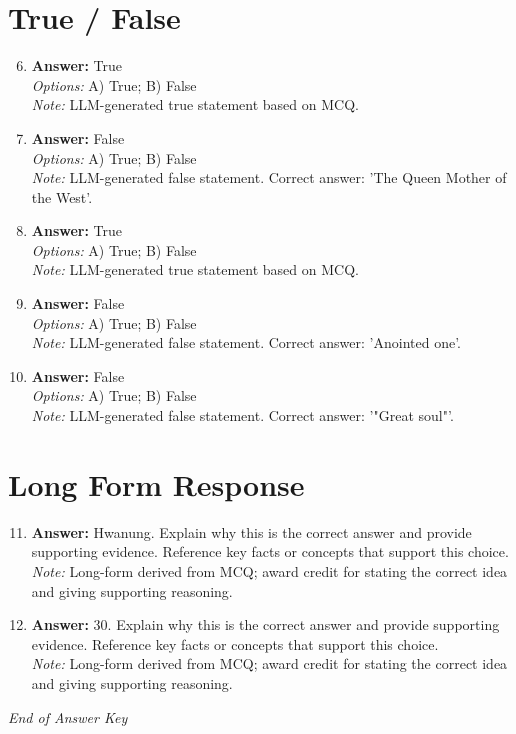 \documentclass[12pt]{article}
\begin{document}
\section*{True / False}
\begin{enumerate}[label=\arabic*.]
\setcounter{enumi}{5}
\item \textbf{Answer:} True
\\ \textit{Options:} A) True; B) False
\\ \textit{Note:} LLM-generated true statement based on MCQ.
\item \textbf{Answer:} False
\\ \textit{Options:} A) True; B) False
\\ \textit{Note:} LLM-generated false statement. Correct answer: 'The Queen Mother of the West'.
\item \textbf{Answer:} True
\\ \textit{Options:} A) True; B) False
\\ \textit{Note:} LLM-generated true statement based on MCQ.
\item \textbf{Answer:} False
\\ \textit{Options:} A) True; B) False
\\ \textit{Note:} LLM-generated false statement. Correct answer: 'Anointed one'.
\item \textbf{Answer:} False
\\ \textit{Options:} A) True; B) False
\\ \textit{Note:} LLM-generated false statement. Correct answer: '"Great soul"'.
\end{enumerate}

\section*{Long Form Response}
\begin{enumerate}[label=\arabic*.]
\setcounter{enumi}{10}
\item \textbf{Answer:} Hwanung. Explain why this is the correct answer and provide supporting evidence. Reference key facts or concepts that support this choice.
\\ \textit{Note:} Long-form derived from MCQ; award credit for stating the correct idea and giving supporting reasoning.
\item \textbf{Answer:} 30. Explain why this is the correct answer and provide supporting evidence. Reference key facts or concepts that support this choice.
\\ \textit{Note:} Long-form derived from MCQ; award credit for stating the correct idea and giving supporting reasoning.
\end{enumerate}

\vfill
\noindent\textit{End of Answer Key}
\end{document}
